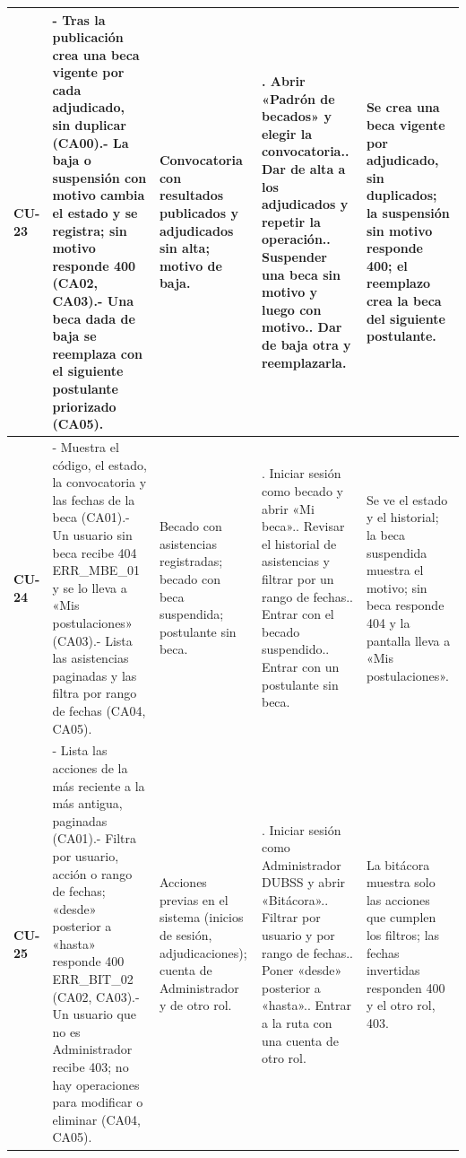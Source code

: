 {\begin{longtable}{@{}>{\raggedright\arraybackslash}p{1.2cm}>{\raggedright\arraybackslash}p{3.7cm}>{\raggedright\arraybackslash}p{3.0cm}>{\raggedright\arraybackslash}p{4.4cm}>{\raggedright\arraybackslash}p{3.4cm}@{}}
\midrule
\textbf{CU-23} & - Tras la publicación crea una beca vigente por cada adjudicado, sin duplicar (CA00).\newline - La baja o suspensión con motivo cambia el estado y se registra; sin motivo responde 400 (CA02, CA03).\newline - Una beca dada de baja se reemplaza con el siguiente postulante priorizado (CA05). & Convocatoria con resultados publicados y adjudicados sin alta; motivo de baja. & 1. Abrir «Padrón de becados» y elegir la convocatoria.\newline 2. Dar de alta a los adjudicados y repetir la operación.\newline 3. Suspender una beca sin motivo y luego con motivo.\newline 4. Dar de baja otra y reemplazarla. & Se crea una beca vigente por adjudicado, sin duplicados; la suspensión sin motivo responde 400; el reemplazo crea la beca del siguiente postulante. \\
\midrule
\textbf{CU-24} & - Muestra el código, el estado, la convocatoria y las fechas de la beca (CA01).\newline - Un usuario sin beca recibe 404 ERR\_MBE\_01 y se lo lleva a «Mis postulaciones» (CA03).\newline - Lista las asistencias paginadas y las filtra por rango de fechas (CA04, CA05). & Becado con asistencias registradas; becado con beca suspendida; postulante sin beca. & 1. Iniciar sesión como becado y abrir «Mi beca».\newline 2. Revisar el historial de asistencias y filtrar por un rango de fechas.\newline 3. Entrar con el becado suspendido.\newline 4. Entrar con un postulante sin beca. & Se ve el estado y el historial; la beca suspendida muestra el motivo; sin beca responde 404 y la pantalla lleva a «Mis postulaciones». \\
\midrule
\textbf{CU-25} & - Lista las acciones de la más reciente a la más antigua, paginadas (CA01).\newline - Filtra por usuario, acción o rango de fechas; «desde» posterior a «hasta» responde 400 ERR\_BIT\_02 (CA02, CA03).\newline - Un usuario que no es Administrador recibe 403; no hay operaciones para modificar o eliminar (CA04, CA05). & Acciones previas en el sistema (inicios de sesión, adjudicaciones); cuenta de Administrador y de otro rol. & 1. Iniciar sesión como Administrador DUBSS y abrir «Bitácora».\newline 2. Filtrar por usuario y por rango de fechas.\newline 3. Poner «desde» posterior a «hasta».\newline 4. Entrar a la ruta con una cuenta de otro rol. & La bitácora muestra solo las acciones que cumplen los filtros; las fechas invertidas responden 400 y el otro rol, 403. \\

\end{longtable}}
